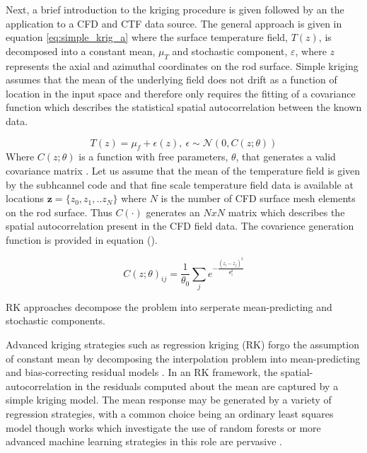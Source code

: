 Next, a brief introduction to the kriging procedure is given followed by an the application to a CFD and CTF data source.  The general approach is given in equation \ref{eq:simple_krig_a} where the surface temperature field, $T(z)$, is decomposed into a constant mean, $\mu_T$ and stochastic component, $\varepsilon$, where $z$ represents the axial and azimuthal coordinates on the rod surface. Simple kriging assumes that the mean of the underlying field does not drift as a function of location in the input space and therefore only requires the fitting of a covariance function which describes the statistical spatial autocorrelation between the known data.  

\begin{equation}
T(z) = \mu_f + \epsilon(z),\ \epsilon \sim \mathcal N(0, C(z;\theta))
\label{eq:simple_krig_a}
\end{equation}
Where $C(z;\theta)$ is a function  with free parameters, $\theta$, that generates a valid covariance matrix .  Let us assume that the mean of the temperature field is given by the subhcannel code and that fine scale temperature field data is available at locations $\mathbf z = \{z_0, z_1, .. z_N\}$ where $N$ is the number of CFD surface mesh elements on the rod surface.  Thus $C(\cdot)$ generates an $NxN$ matrix which describes the spatial autocorrelation present in the CFD field data.  The covarience generation function is provided in equation ().

\begin{equation}
C(z;\theta)_{ij} = \frac{1}{\theta_0} \sum_j e^{- \frac{(z_i - z_j)^2}{\theta_1^2}}
\end{equation}

RK approaches decompose the problem into serperate mean-predicting and stochastic components.

Advanced kriging strategies such as regression kriging (RK) forgo the assumption of constant mean by decomposing the interpolation problem into mean-predicting and bias-correcting residual models \cite{Hengl07}.  In an RK framework, the spatial-autocorrelation in the residuals computed about the mean are captured by a simple kriging model.  The mean response may be generated by a variety of regression strategies, with a common choice being an ordinary least squares model though works which investigate the use of random forests or more advanced machine learning strategies in this role are pervasive \cite{LI20111647} \cite{LI2017112}.


